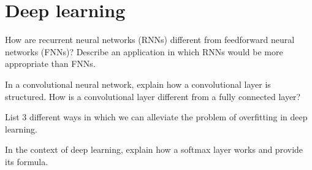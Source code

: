 \documentclass[11pt]{article}
\newcounter{marks}
\begin{document}
\pagebreak

\section*{Deep learning}
\begin{list}{{\bf Question 4.:}}
	{
	}

\item
{}
\addtocounter{marks}{1}
How are recurrent neural networks (RNNs) different from feedforward neural networks (FNNs)? Describe an application in which RNNs would be more appropriate than FNNs.

\item
{}
\addtocounter{marks}{1}
In a convolutional neural network, explain how a convolutional layer is structured. How is a convolutional layer different from a fully connected layer?

\item
{}
\addtocounter{marks}{1}
List 3 different ways in which we can alleviate the problem of overfitting in deep learning.

\item
{}
\addtocounter{marks}{1}
In the context of deep learning, explain how a softmax layer works and provide its formula.

\end{list}
\end{document}
